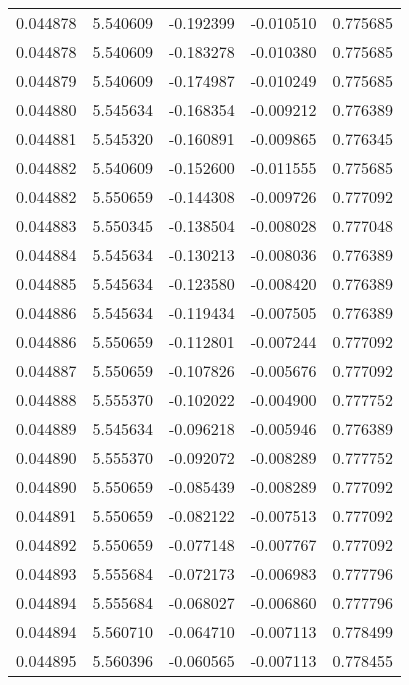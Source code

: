 \begin{tabular}{lrrrr}
0.044878    &  5.540609 & -0.192399 & -0.010510 &             0.775685 \\
0.044878    &  5.540609 & -0.183278 & -0.010380 &             0.775685 \\
0.044879    &  5.540609 & -0.174987 & -0.010249 &             0.775685 \\
0.044880    &  5.545634 & -0.168354 & -0.009212 &             0.776389 \\
0.044881    &  5.545320 & -0.160891 & -0.009865 &             0.776345 \\
0.044882    &  5.540609 & -0.152600 & -0.011555 &             0.775685 \\
0.044882    &  5.550659 & -0.144308 & -0.009726 &             0.777092 \\
0.044883    &  5.550345 & -0.138504 & -0.008028 &             0.777048 \\
0.044884    &  5.545634 & -0.130213 & -0.008036 &             0.776389 \\
0.044885    &  5.545634 & -0.123580 & -0.008420 &             0.776389 \\
0.044886    &  5.545634 & -0.119434 & -0.007505 &             0.776389 \\
0.044886    &  5.550659 & -0.112801 & -0.007244 &             0.777092 \\
0.044887    &  5.550659 & -0.107826 & -0.005676 &             0.777092 \\
0.044888    &  5.555370 & -0.102022 & -0.004900 &             0.777752 \\
0.044889    &  5.545634 & -0.096218 & -0.005946 &             0.776389 \\
0.044890    &  5.555370 & -0.092072 & -0.008289 &             0.777752 \\
0.044890    &  5.550659 & -0.085439 & -0.008289 &             0.777092 \\
0.044891    &  5.550659 & -0.082122 & -0.007513 &             0.777092 \\
0.044892    &  5.550659 & -0.077148 & -0.007767 &             0.777092 \\
0.044893    &  5.555684 & -0.072173 & -0.006983 &             0.777796 \\
0.044894    &  5.555684 & -0.068027 & -0.006860 &             0.777796 \\
0.044894    &  5.560710 & -0.064710 & -0.007113 &             0.778499 \\
0.044895    &  5.560396 & -0.060565 & -0.007113 &             0.778455 \\

\end{tabular}

